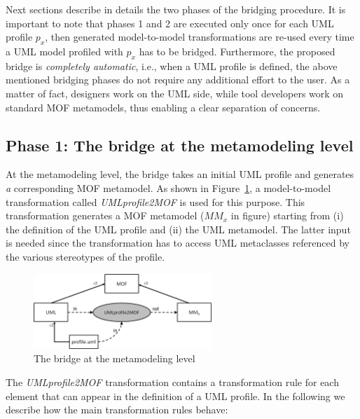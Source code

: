 Next sections describe in details the two phases of the bridging procedure.
It is important to note that phases 1 and 2 are executed only once for each UML profile $p_x$, then generated model-to-model transformations
are re-used every time a UML model profiled with $p_x$ has to be bridged.
Furthermore, the proposed bridge is \textit{completely automatic}, i.e., when a UML profile is defined, the above mentioned bridging phases do not require any additional effort to the user. As a matter of fact, designers work on the UML side, while tool developers work on standard MOF metamodels, thus enabling a clear separation of concerns.


\subsection{Phase 1: The bridge at the metamodeling level}\label{sec:metamodelLevel}

At the metamodeling level, the bridge takes an initial UML profile and generates {\em a} corresponding MOF metamodel.
As shown in Figure~\ref{fig:metamodelingLevel}, a model-to-model transformation called
\textit{UMLprofile2MOF} is used for this purpose. This transformation generates a MOF metamodel ($MM_x$ in figure) starting from (i) the definition of the UML profile and (ii) the UML metamodel. The latter input is needed since the transformation has to access UML metaclasses referenced by the various stereotypes of the profile.

\begin{figure}[htbp]
	\centering
		\includegraphics[width=0.60\textwidth]{figures/metamodelingLevel.png}
	\caption{The bridge at the metamodeling level}
	\label{fig:metamodelingLevel}
\end{figure}


%
The \textit{UMLprofile2MOF} transformation contains a transformation rule for each element that can appear in the definition of a UML profile. In the following we describe how the main transformation rules behave:

